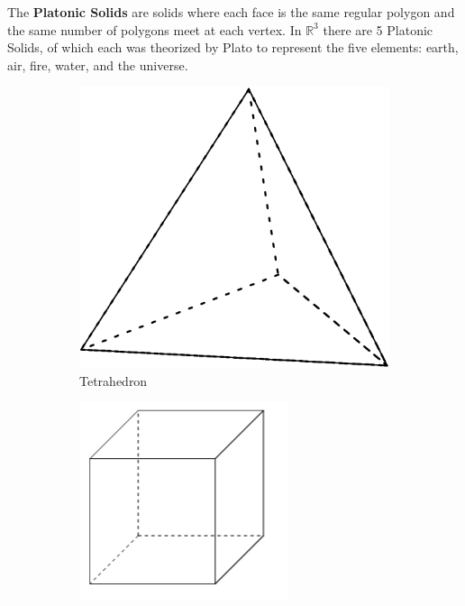 \documentclass{article}
\begin{document}
            \noindent The \textbf{Platonic Solids} are solids where each face is the same regular
            polygon and the same number of polygons meet at each vertex. In $\mathbb{R}^3$ there are
            5 Platonic Solids, of which each was theorized by Plato to represent the five elements:
            earth, air, fire, water, and the universe. \\

            \begin{figure} [hbt!]
                \centering
                \begin{subfigure}[b]{.45\linewidth}
                    \includegraphics[scale=0.25]{Resources/Unit6Solids/tetrahedron.png}
                    \caption*{Tetrahedron}
                \end{subfigure}
                \begin{subfigure}[b]{.45\linewidth}
                    \includegraphics[scale=0.5]{Resources/Unit6Solids/cube.PNG}

\end{subfigure}
\end{figure}
\end{document}
